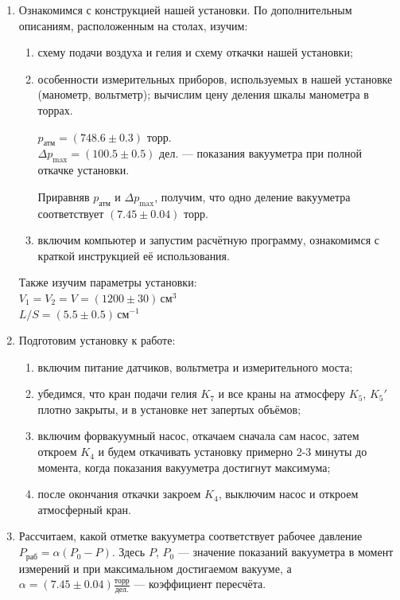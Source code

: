 \documentclass[a4paper,12pt]{article} %
\begin{document}
\begin{enumerate}
  \item Ознакомимся с конструкцией нашей установки. По дополнительным описаниям, расположенным на столах, изучим:
  \begin{enumerate}
    \item схему подачи воздуха и гелия и схему откачки нашей установки;
    \item особенности измерительных приборов, используемых в нашей установке (манометр, вольтметр); вычислим цену деления шкалы манометра в торрах.

    $p_{\text{атм}} = (748.6 \pm 0.3)$ торр. \\
    $\Delta p_{\text{max}} = (100.5 \pm 0.5)$ дел. — показания вакууметра при полной откачке установки.

    Приравняв $p_{\text{атм}}$ и $\Delta p_{\text{max}}$, получим, что одно деление вакууметра соответствует $(7.45 \pm 0.04)$ торр.
    
    \item включим компьютер и запустим расчётную программу, ознакомимся с краткой инструкцией её использования.
    
  \end{enumerate}

  Также изучим параметры установки: \\
  $V_1 = V_2 = V = (1200 \pm 30) \, \text{см}^3$ \\
  $L/S = (5.5 \pm 0.5) \, \text{см}^{-1}$ 
  
  \item Подготовим установку к работе:
  \begin{enumerate}
    \item включим питание датчиков, вольтметра и измерительного моста;
    \item убедимся, что кран подачи гелия $K_7$ и все краны на атмосферу $K_5,\, K_5'$ плотно закрыты, и в установке нет запертых объёмов;
    \item включим форвакуумный насос, откачаем сначала сам насос, затем откроем $K_4$ и будем откачивать установку примерно 2-3 минуты до момента, когда показания вакууметра достигнут максимума;
    \item после окончания откачки закроем $K_4$, выключим насос и откроем атмосферный кран.
  \end{enumerate}
  
  \item Рассчитаем, какой отметке вакууметра соответствует рабочее давление $P_\text{раб} = \alpha (P_0 - P)$. Здесь $P$, $P_0$ — значение показаний вакууметра в момент измерений и при максимальном достигаемом вакууме, а $\alpha = (7.45 \pm 0.04) \frac{\text{торр}}{\text{дел.}}$ — коэффициент пересчёта.
  

\end{enumerate}
\end{document}
